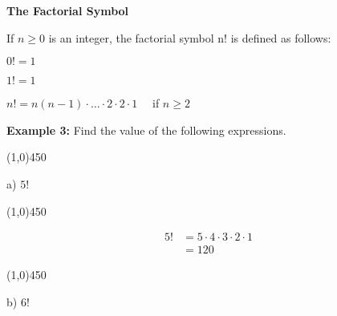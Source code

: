 \documentclass{report}
\begin{document}
\begin{LARGE}
	\begin{center}
		\textbf{The Factorial Symbol}
	\end{center}
\end{LARGE}
\bigbreak \noindent
\begin{large}
 If $n \ge 0$ is an integer, the factorial symbol n! is defined as follows:
 \vspace{7mm}

\begin{mdframed}
	\vspace{4mm} 

 \begin{center}
  $0! = 1$
  \vspace{3mm}

	$1! = 1$
	\vspace{3mm}

	$n !=n(n-1) \cdot \ldots \cdot 2 \cdot 2 \cdot 1 \quad$ if $n \ge 2 $
 \end{center}
 \vspace{4mm}

\end{mdframed}
\end{large}
\bigbreak \noindent \bigbreak \noindent \bigbreak \noindent
\begin{large}
 \begin{center}
	 \textbf{Example 3:} 
	 Find the value of the following expressions.
 \end{center} 
\end{large}
\bigbreak \noindent

\line(1,0){450}

\begin{center}
\begin{large}
	{\LARGE{a)}} $5!$
\end{large}
\end{center}

\line(1,0){450}

\begin{align*}
	5! & = 5\cdot 4\cdot 3\cdot 2\cdot 1 \\ & = 120
\end{align*}
\bigbreak \noindent \bigbreak \noindent

\line(1,0){450}

\begin{center}
\begin{large}
	{\LARGE{b)}} $6!$
\end{large}
\end{center}
\end{document}
